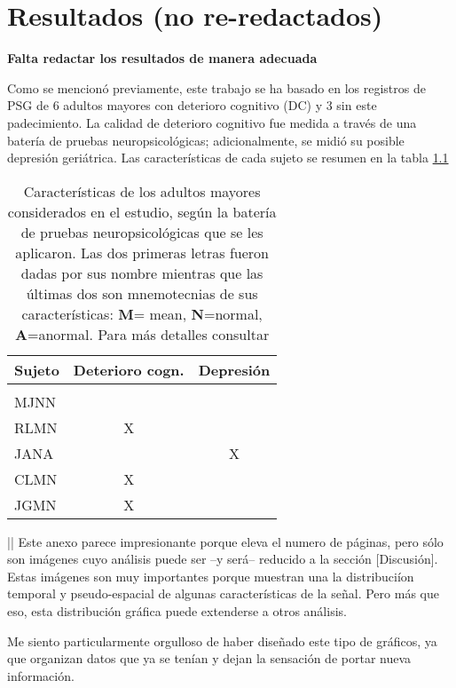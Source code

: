 \chapter{Resultados (no re-redactados)}

\textbf{Falta redactar los resultados de manera adecuada}

Como se mencion\'o previamente, este trabajo se ha basado en los registros de PSG de 6 adultos
mayores con deterioro cognitivo (DC) y 3 sin este padecimiento. La calidad de deterioro
cognitivo fue medida a trav\'es de una bater\'ia de pruebas neuropsicol\'ogicas;
adicionalmente, se midi\'o su posible depresi\'on geri\'atrica. Las caracter\'isticas
de cada sujeto se resumen en la tabla \ref{sujetos}

\begin{table}
\centering
\begin{tabular}{l|cc}
Sujeto & Deterioro cogn. & Depresi\'on
\\
\hline
\\
MJNN &   &   \\
RLMN & X &   \\
JANA &   & X \\
CLMN & X &   \\
JGMN & X &   \\
\end{tabular}
\caption{Caracter\'isticas de los adultos mayores considerados en el estudio, seg\'un la bater\'ia
de pruebas neuropsicol\'ogicas que se les aplicaron. 
Las dos primeras letras fueron dadas por sus nombre mientras que las \'ultimas dos son
mnemotecnias de sus caracter\'isticas: \textbf{M}= mean, \textbf{N}=normal, \textbf{A}=anormal.
Para m\'as detalles consultar \cite{VazquezTagle16}}
\label{sujetos}
\end{table}


||
Este anexo parece impresionante porque eleva el numero de p\'aginas, pero s\'olo son im\'agenes 
cuyo an\'alisis puede ser --y ser\'a-- reducido a la secci\'on [Discusi\'on]. 
Estas im\'agenes son muy importantes
porque muestran una la distribuci\'ion temporal y pseudo-espacial 
de algunas caracter\'isticas de la se\~nal. Pero m\'as que eso, esta distribuci\'on gr\'afica
puede extenderse a otros an\'alisis.


Me siento particularmente orgulloso
de haber dise\~nado este tipo de gr\'aficos, ya que  organizan datos que ya se ten\'ian
y dejan la sensaci\'on de portar nueva informaci\'on.

%
